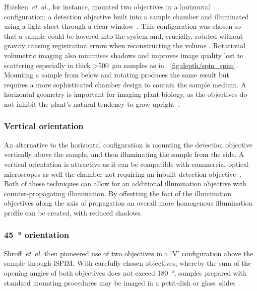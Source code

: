 Huisken~\emph{et~al.}, for instance, mounted two objectives in a horizontal configuration; a detection objective built into a sample chamber and illuminated using a \gls{light-sheet} through a clear window~\cite{huisken_optical_2004}.
This configuration was chosen so that a sample could be lowered into the system and, crucially, rotated without gravity causing registration errors when reconstructing the volume .%
Rotational volumetric imaging also minimises shadows and improves image quality lost to scattering especially in thick \SI{>500}{\micro\meter} samples as in \figurename~\ref{fig:depth/spin_spim}.
Mounting a sample from below and rotating produces the same result but requires a more sophisticated chamber design to contain the sample medium.
A horizontal geometry is important for imaging plant biology, as the objectives do not inhibit the plant's natural tendency to grow upright~\cite{wangenheimRulesSelfOrganizingProperties2016a}. %

\subsubsection{Vertical orientation}

An alternative to the horizontal configuration is mounting the detection objective vertically above the sample, and then illuminating the sample from the side.
A vertical orientation is attractive as it can be compatible with commercial optical microscopes as well the chamber not requiring an inbuilt detection objective~\cite{schlegel-zawadzkaFluorescenceImagingSpectroscopy1997,wuSpatiallyIsotropicFourdimensional2013}.
Both of these techniques can allow for an additional illumination objective with counter-propagating illumination.
By offsetting the foci of the illumination objectives along the axis of propagation an overall more homogenous illumination profile can be created, with reduced shadows.

\subsubsection{\SI{45}{\degree} orientation}

Shroff~\emph{et~al.} then pioneered use of two objectives in a `V' configuration above the sample through \gls{iSPIM}.
With carefully chosen objectives, whereby the sum of the opening angles of both objectives does not exceed \SI{180}{\degree},
samples prepared with standard mounting procedures may be imaged in a petri-dish or glass~slides~\cite{kumarDualViewPlaneIllumination2014}.


